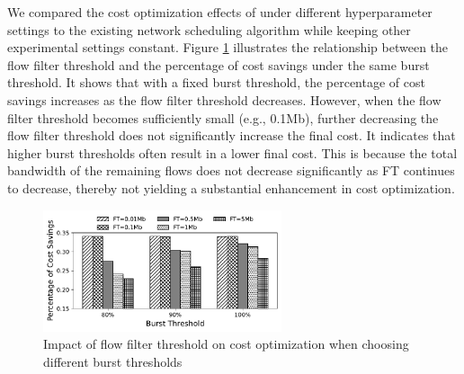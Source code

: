 \begin{table}[tbp]
	\centering
        \vspace{-0.1in}
	\caption{\small Cost optimization for 1 to 7 days of offline testing under a 90\% burst threshold and a 0.1Mb flow filter threshold}
	\label{tab:7days}
\end{table}

We compared the cost optimization effects of {\sys} under different hyperparameter settings to the existing network scheduling algorithm while keeping other experimental settings constant. Figure \ref{fig:costTestpara1} illustrates the relationship between the flow filter threshold and the percentage of cost savings under the same burst threshold. It shows that with a fixed burst threshold, the percentage of cost savings increases as the flow filter threshold decreases. However, when the flow filter threshold becomes sufficiently small (e.g., 0.1Mb), further decreasing the flow filter threshold does not significantly increase the final cost. It indicates that higher burst thresholds often result in a lower final cost. This is because the total bandwidth of the remaining flows does not decrease significantly as FT continues to decrease, thereby not yielding a substantial enhancement in cost optimization.

\begin{figure}
	\centering
	\includegraphics[width = 7cm]{figs/evaluation/costTestpara1.pdf}
	\caption{\small Impact of flow filter threshold on cost optimization when choosing different burst thresholds}
	\label{fig:costTestpara1}
\end{figure}


